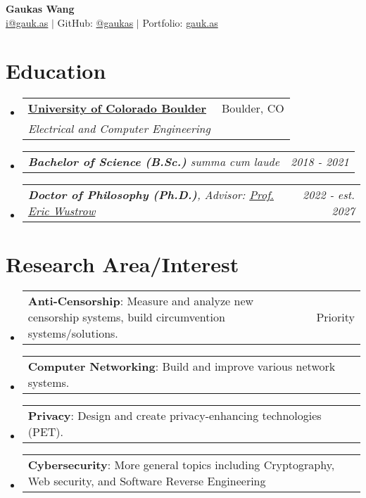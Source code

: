 \documentclass[letterpaper,11pt]{article}
\makeatletter
\newcommand{\resumeSubheading}[4]{
  \vspace{-2pt}\item
    \begin{tabular*}{0.97\textwidth}[t]{l@{\extracolsep{\fill}}r}
      \textbf{#1} & #2 \\
      \textit{\small#3} & \textit{\small #4} \\
    \end{tabular*}\vspace{-7pt}
}
\newcommand{\resumeSubSubheading}[2]{
    \item
    \begin{tabular*}{0.97\textwidth}{l@{\extracolsep{\fill}}r}
      \textit{\small#1} & \textit{\small #2} \\
    \end{tabular*}\vspace{-7pt}
}
\newcommand{\resumeProjectHeading}[2]{
    \item
    \begin{tabular*}{0.97\textwidth}{l@{\extracolsep{\fill}}r}
      \small#1 & #2 \\
    \end{tabular*}\vspace{-7pt}
}
\newcommand{\resumeSubHeadingListStart}{\begin{itemize}[leftmargin=0.15in, label={}]}
\newcommand{\resumeSubHeadingListEnd}{\end{itemize}}
\makeatother
\begin{document}
\begin{center}
  {\textbf{\Huge Gaukas Wang}} \\ \vspace{4pt}
    \href{mailto: i@gauk.as}{{i@gauk.as}} $|$ 
    GitHub: \href{https://github.com/gaukas}{@gaukas} $|$ 
    Portfolio: \href{https://gauk.as}{gauk.as}
\end{center}


\section{Education}
\resumeSubHeadingListStart
\resumeSubheading
{\href{https://colorado.edu}{University of Colorado Boulder}}{Boulder, CO}
{Electrical and Computer Engineering}{}
\resumeSubSubheading
{
  \em{\textbf{Bachelor of Science (B.Sc.)}} \textit{summa cum laude}
}{2018 - 2021}
\resumeSubSubheading
{
  \em{}\textbf{Doctor of Philosophy (Ph.D.)}, 
  {Advisor: \href{https://ericw.us/trow}{Prof. Eric Wustrow}}
}{2022 - est. 2027}
\resumeSubHeadingListEnd

\vspace{1pt}

\section{Research Area/Interest}
\resumeSubHeadingListStart
  \resumeProjectHeading {\textbf{Anti-Censorship}: Measure and analyze new censorship systems, build circumvention systems/solutions.}{Priority}
  \resumeProjectHeading {\textbf{Computer Networking}: Build and improve various network systems.}{}
  \resumeProjectHeading {\textbf{Privacy}: Design and create privacy-enhancing technologies (PET).}{}
  \resumeProjectHeading {\textbf{Cybersecurity}: More general topics including Cryptography, Web security, and Software Reverse Engineering}{}
\resumeSubHeadingListEnd
\vspace{1pt}

\end{document}

